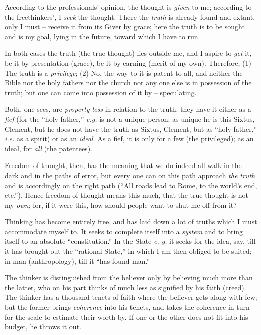 According to the professionals' opinion, the thought is \textit{given} to me; 
according to the freethinkers', I \textit{seek} the thought. There the 
\textit{truth} is already found and extant, only I must -- receive it from its 
Giver by grace; here the truth is to be sought and is my goal, lying in the 
future, toward which I have to run.

In both cases the truth (the true thought) lies outside me, and I aspire to 
\textit{get} it, be it by presentation (grace), be it by earning (merit of my 
own). Therefore, (1) The truth is a \textit{privilege}; (2) No, the way to it 
is patent to all, and neither the Bible nor the holy fathers nor the church 
nor any one else is in possession of the truth; but one can come into 
possession of it by -- speculating.

Both, one sees, are \textit{property-less} in relation to the truth: they have 
it either as a \textit{fief} (for the ``holy father,'' \textit{e.g.} is not 
a unique person; as unique he is this Sixtus, Clement, but he does not have 
the truth as Sixtus, Clement, but as ``holy father,'' \textit{i.e.} as a 
spirit) or as an \textit{ideal}. As a fief, it is only for a few (the 
privileged); as an ideal, for \textit{all} (the patentees).

Freedom of thought, then, has the meaning that we do indeed all walk in the 
dark and in the paths of error, but every one can on this path approach 
\textit{the truth} and is accordingly on the right path (``All roads lead to 
Rome, to the world's end, etc.''). Hence freedom of thought means this much, 
that the true thought is not my \textit{own}; for, if it were this, how should 
people want to shut me off from it?

Thinking has become entirely free, and has laid down a lot of truths which I 
must accommodate myself to. It seeks to complete itself into a \textit{system} 
and to bring itself to an absolute ``constitution.'' In the State \textit{e. 
g.} it seeks for the idea, say, till it has brought out the ``rational 
State,'' in which I am then obliged to be suited; in man (anthropology), till 
it ``has found man.''

The thinker is distinguished from the believer only by believing much more 
than the latter, who on his part thinks of much less as signified by his faith 
(creed). The thinker has a thousand tenets of faith where the believer gets 
along with few; but the former brings \textit{coherence} into his tenets, and 
takes the coherence in turn for the scale to estimate their worth by. If one 
or the other does not fit into his budget, he throws it out.

